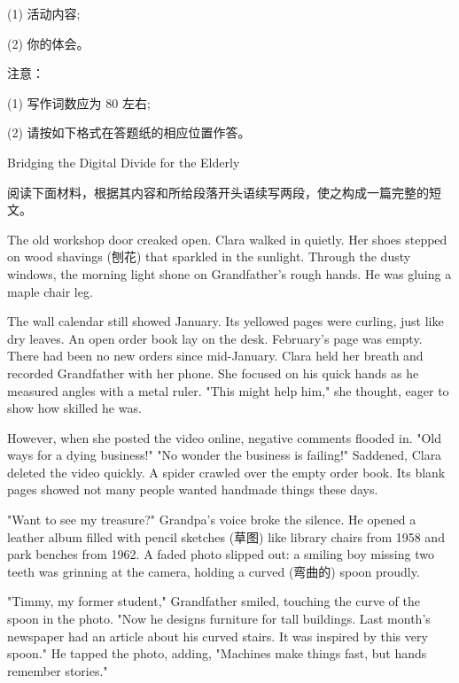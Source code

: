 \documentclass{英语试卷}
\begin{document}
\par (1) 活动内容;\par
\par (2) 你的体会。\par
\par 注意：\par
\par (1) 写作词数应为 80 左右;\par
\par (2) 请按如下格式在答题纸的相应位置作答。\par
\par Bridging the Digital Divide for the Elderly\par
{}
\par 阅读下面材料，根据其内容和所给段落开头语续写两段，使之构成一篇完整的短文。\par
\par The old workshop door creaked open. Clara walked in quietly. Her shoes stepped on wood shavings (刨花) that sparkled in the sunlight. Through the dusty windows, the morning light shone on Grandfather's rough hands. He was gluing a maple chair leg.\par
\par The wall calendar still showed January. Its yellowed pages were curling, just like dry leaves. An open order book lay on the desk. February's page was empty. There had been no new orders since mid-January. Clara held her breath and recorded Grandfather with her phone. She focused on his quick hands as he measured angles with a metal ruler. "This might help him," she thought, eager to show how skilled he was.\par
\par However, when she posted the video online, negative comments flooded in. "Old ways for a dying business!" "No wonder the business is failing!" Saddened, Clara deleted the video quickly. A spider crawled over the empty order book. Its blank pages showed not many people wanted handmade things these days.\par
\par "Want to see my treasure?" Grandpa’s voice broke the silence. He opened a leather album filled with pencil sketches (草图) like library chairs from 1958 and park benches from 1962. A faded photo slipped out: a smiling boy missing two teeth was grinning at the camera, holding a curved (弯曲的) spoon proudly.\par
\par "Timmy, my former student," Grandfather smiled, touching the curve of the spoon in the photo. "Now he designs furniture for tall buildings. Last month's newspaper had an article about his curved stairs. It was inspired by this very spoon." He tapped the photo, adding, "Machines make things fast, but hands remember stories."\par
\end{document}
